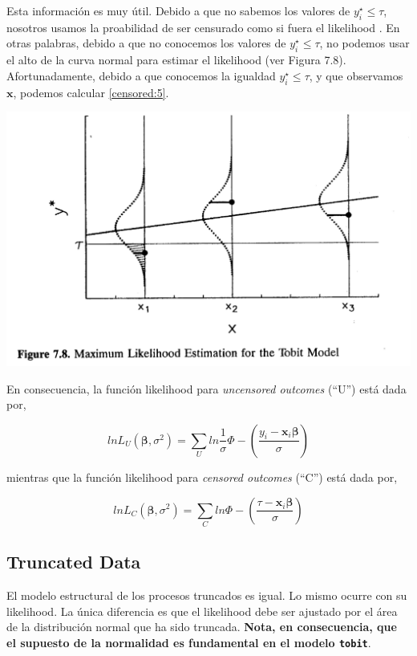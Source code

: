 \documentclass[onesided]{article}\usepackage[]{graphicx}\usepackage[]{color}
\makeatletter
\def\maxwidth{ %
  \ifdim\Gin@nat@width>\linewidth
    \linewidth
  \else
    \Gin@nat@width
  \fi
}
\makeatother
\begin{document}
Esta informaci\'on es muy \'util. Debido a que no sabemos los valores de $y_{i}^{\star}\leq\tau$, nosotros usamos la proabilidad de ser censurado como si fuera el likelihood \parencite[204-205]{Long1997}. En otras palabras, debido a que no conocemos los valores de $y_{i}^{\star}\leq\tau$, no podemos usar el alto de la curva normal para estimar el likelihood (ver Figura 7.8). Afortunadamente, debido a que conocemos la igualdad $y_{i}^{\star}\leq\tau$, y que observamos $\boldsymbol{x}$, podemos calcular \autoref{censored:5}.


{\centering \includegraphics[width=\maxwidth]{fig_7_8.png}}

En consecuencia, la funci\'on likelihood para \emph{uncensored outcomes} (``U'') est\'a dada por,

\begin{equation}\label{censored:6}
lnL_{U}(\boldsymbol{\beta},\sigma^{2}) = \sum_{U}ln\frac{1}{\sigma}\Phi-(\frac{y_{i}-\boldsymbol{x}_{i}\boldsymbol{\beta}}{\sigma})
\end{equation}

mientras que la funci\'on likelihood para \emph{censored outcomes} (``C'') est\'a dada por,

\begin{equation}\label{censored:7}
lnL_{C}(\boldsymbol{\beta},\sigma^{2}) = \sum_{C}ln\Phi-(\frac{\tau-\boldsymbol{x}_{i}\boldsymbol{\beta}}{\sigma})
\end{equation}

\subsection{Truncated Data}

El modelo estructural de los procesos truncados es igual. Lo mismo ocurre con su likelihood. La \'unica diferencia es que el likelihood debe ser ajustado por el \'area de la distribuci\'on normal que ha sido truncada. {\bf Nota, en consecuencia, que el supuesto de la normalidad es fundamental en el modelo \texttt{tobit}}.
\end{document}
